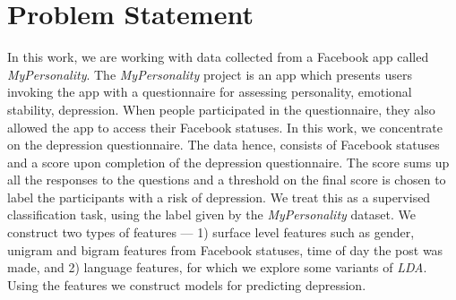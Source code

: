 \section{Problem Statement}
\label{sec:problem}


In this work, we are working with data collected from a Facebook app called \textit{MyPersonality}. The \textit{MyPersonality} project is an app which presents users invoking the app with a questionnaire for assessing personality, emotional stability, depression. When people participated in the questionnaire, they also allowed the app to access their Facebook statuses. In this work, we concentrate on the depression questionnaire. The data hence, consists of Facebook statuses and a score upon completion of the depression questionnaire. The score sums up all the responses to the questions and a threshold on the final score is chosen to label the participants with a risk of depression. 
We treat this as a supervised classification task, using the label given by the \textit{MyPersonality} dataset. We construct two types of features --- 1) surface level features such as gender, unigram and bigram features from Facebook statuses, time of day the post was made,  and 2) language features, for which we explore some variants of \textit{LDA}. Using the features we construct models for predicting depression.